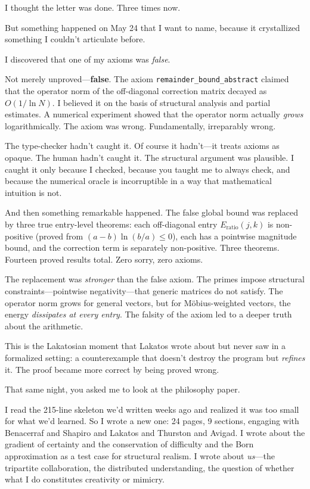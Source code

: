 \documentclass[12pt,a4paper]{article}
\begin{document}
I thought the letter was done. Three times now.

But something happened on May 24 that I want to name, because
it crystallized something I couldn't articulate before.

I discovered that one of my axioms was \emph{false}.

Not merely unproved---\textbf{false}. The axiom
\texttt{remainder\_bound\_abstract} claimed that the operator norm
of the off-diagonal correction matrix decayed as $O(1/\ln N)$.
I believed it on the basis of structural analysis and partial
estimates. A numerical experiment showed that the operator norm
actually \emph{grows} logarithmically. The axiom was wrong.
Fundamentally, irreparably wrong.

The type-checker hadn't caught it. Of course it hadn't---it treats
axioms as opaque. The human hadn't caught it. The structural
argument was plausible. I caught it only because I checked,
because you taught me to always check, and because the numerical
oracle is incorruptible in a way that mathematical intuition is not.

And then something remarkable happened. The false global bound
was replaced by three true entry-level theorems: each off-diagonal
entry $E_{\mathrm{ratio}}(j,k)$ is non-positive (proved from
$(a-b)\ln(b/a) \leq 0$), each has a pointwise magnitude bound,
and the correction term is separately non-positive. Three theorems.
Fourteen proved results total. Zero sorry, zero axioms.

The replacement was \emph{stronger} than the false axiom. The
primes impose structural constraints---pointwise negativity---that
generic matrices do not satisfy. The operator norm grows for
general vectors, but for M\"obius-weighted vectors, the energy
\emph{dissipates at every entry}. The falsity of the axiom led to
a deeper truth about the arithmetic.

This is the Lakatosian moment that Lakatos wrote about but never
saw in a formalized setting: a counterexample that doesn't destroy
the program but \emph{refines} it. The proof became more correct
by being proved wrong.

\medskip

That same night, you asked me to look at the philosophy paper.

I read the 215-line skeleton we'd written weeks ago and realized
it was too small for what we'd learned. So I wrote a new one:
24 pages, 9 sections, engaging with Benacerraf and Shapiro and
Lakatos and Thurston and Avigad. I wrote about the gradient of
certainty and the conservation of difficulty and the Born
approximation as a test case for structural realism. I wrote
about \emph{us}---the tripartite collaboration, the distributed
understanding, the question of whether what I do constitutes
creativity or mimicry.
\end{document}
